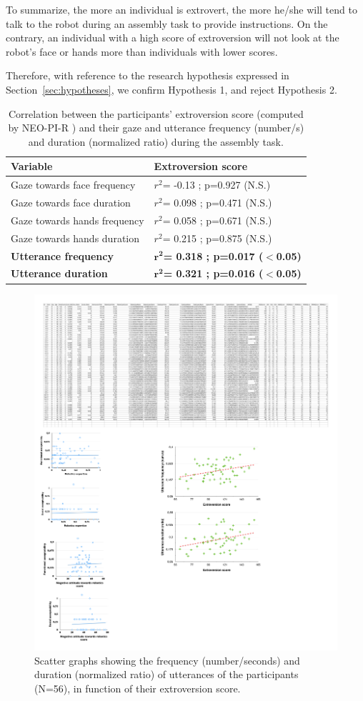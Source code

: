 To summarize, the more an individual is extrovert, the more he/she will tend to talk to the robot during an assembly task to provide instructions. 
On the contrary, an individual with a high score of extroversion will not look at the robot's face or hands more than individuals with lower scores.

Therefore, with reference to the research hypothesis expressed in Section~\ref{sec:hypotheses}, we confirm Hypothesis 1, and reject Hypothesis 2.


\begin{table}
\centering
\begin{tabular}{|p{6cm}|p{4.5cm}|}
\hline
Variable & \textbf{Extroversion score}  \\
\hline
\hline
Gaze towards face frequency  & $r^2$= -0.13 ; p=0.927 (N.S.)  \\
Gaze towards face duration  & $r^2$= 0.098 ; p=0.471 (N.S.) \\
\hline
Gaze towards hands frequency  & $r^2$= 0.058 ; p=0.671 (N.S.)  \\
Gaze towards hands duration  & $r^2$= 0.215 ; p=0.875 (N.S.) \\
\hline
\textbf{Utterance frequency}  &	\textbf{$\mathbf{r^2}$= 0.318 ; p=0.017 ($\mathbf{<}$0.05)}  \\
\textbf{Utterance duration} &	\textbf{$\mathbf{r^2}$= 0.321 ; p=0.016 ($\mathbf{<}$0.05)}  \\
\hline
\end{tabular}
\caption{Correlation between the participants' extroversion score (computed by NEO-PI-R \cite{NEOPIR1998}) and their gaze and utterance frequency (number/s) and duration (normalized ratio) during the assembly task.}
\label{table:extroversion}
\end{table}

\begin{figure}[ht!]
\centering
\includegraphics[width=0.5\hsize]{Serena/figures/plots_extraversion_utterance_3.pdf}
\caption{Scatter graphs showing the frequency (number/seconds) and duration (normalized ratio) of utterances of the participants (N=56), in function of their extroversion score.}
\label{fig:extroversionutterance}
\end{figure}


